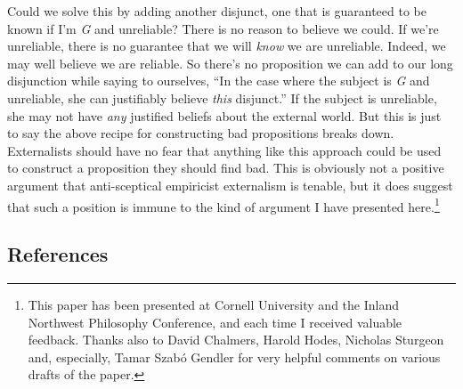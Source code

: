 \documentclass[
  11pt,
  letterpaper,
  DIV=11,
  numbers=noendperiod,
  twoside]{scrartcl}
\begin{document}
Could we solve this by adding another disjunct, one that is guaranteed
to be known if I'm \emph{G} and unreliable? There is no reason to
believe we could. If we're unreliable, there is no guarantee that we
will \emph{know} we are unreliable. Indeed, we may well believe we are
reliable. So there's no proposition we can add to our long disjunction
while saying to ourselves, ``In the case where the subject is \emph{G}
and unreliable, she can justifiably believe \emph{this} disjunct.'' If
the subject is unreliable, she may not have \emph{any} justified beliefs
about the external world. But this is just to say the above recipe for
constructing bad propositions breaks down. Externalists should have no
fear that anything like this approach could be used to construct a
proposition they should find bad. This is obviously not a positive
argument that anti-sceptical empiricist externalism is tenable, but it
does suggest that such a position is immune to the kind of argument I
have presented here.\footnote{This paper has been presented at Cornell
  University and the Inland Northwest Philosophy Conference, and each
  time I received valuable feedback. Thanks also to David Chalmers,
  Harold Hodes, Nicholas Sturgeon and, especially, Tamar Szabó Gendler
  for very helpful comments on various drafts of the paper.}

\subsection*{References}\label{references}
\end{document}
